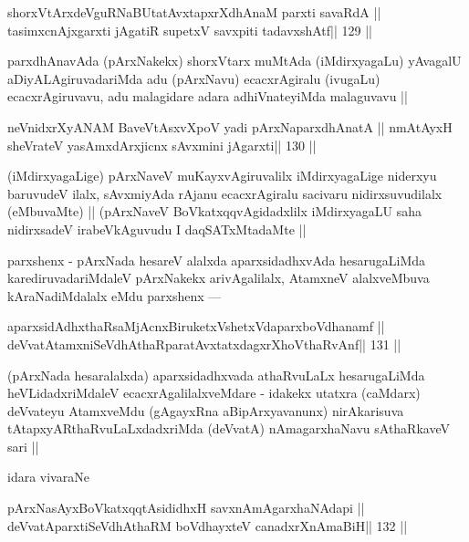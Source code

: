 \begin{shl}
shorxVtArxdeVguRNaBUtatAvxtapxrXdhAnaM parxti savaRdA ||
tasimxcnAjxgarxti jAgatiR supetxV savxpiti tadavxshAtf\hfill || 129 ||
\end{shl}

\begin{artha}
parxdhAnavAda (pArxNakekx) shorxVtarx muMtAda (iMdirxyagaLu) yAvagalU aDiyALAgiruvadariMda adu (pArxNavu) ecacxrAgiralu (ivugaLu) ecacxrAgiruvavu, adu malagidare adara adhiVnateyiMda malaguvavu ||
\end{artha}

\begin{shl}
neVnidxrXyANAM BaveVtAsxvXpoV yadi pArxNaparxdhAnatA ||
nmAtAyxH sheVrateV yasAmxdArxjicnx sAvxmini jAgarxti\hfill || 130 ||
\end{shl}

\begin{artha}
(iMdirxyagaLige) pArxNaveV muKayxvAgiruvalilx iMdirxyagaLige niderxyu baruvudeV ilalx, sAvxmiyAda rAjanu ecacxrAgiralu sacivaru nidirxsuvudilalx (eMbuvaMte) || (pArxNaveV BoVkatxqqvAgidadxlilx iMdirxyagaLU saha nidirxsadeV irabeVkAguvudu I daqSATxMtadaMte ||
\end{artha}

\begin{artha}
parxshenx - pArxNada hesareV alalxda aparxsidadhxvAda hesarugaLiMda karediruvadariMdaleV pArxNakekx arivAgalilalx, AtamxneV alalxveMbuva kAraNadiMdalalx eMdu parxshenx ---
\end{artha}

\begin{shl}
aparxsidAdhxthaRsaMjAcnxBiruketxVshetxVdaparxboVdhanamf ||
deVvatAtamxniSeVdhAthaRparatAvxtatxdagxrXhoV\s thaRvAnf\hfill || 131 ||
\end{shl}

\begin{artha}
(pArxNada hesaralalxda) aparxsidadhxvada athaRvuLaLx hesarugaLiMda heVLidadxriMdaleV ecacxrAgalilalxveMdare - idakekx utatxra (caMdarx) deVvateyu AtamxveMdu (gAgayxRna aBipArxyavanunx) nirAkarisuva tAtapxyARthaRvuLaLxdadxriMda (deVvatA) nAmagarxhaNavu sAthaRkaveV sari ||
\end{artha}

\begin{artha}
idara vivaraNe
\end{artha}

\begin{shl}
pArxNasAyxBoVkatxqqtAsididhxH savxnAmAgarxhaNAdapi ||
deVvatAparxtiSeVdhAthaRM boVdhayxteV  canadxrXnAmaBiH\hfill || 132 ||
\end{shl}

